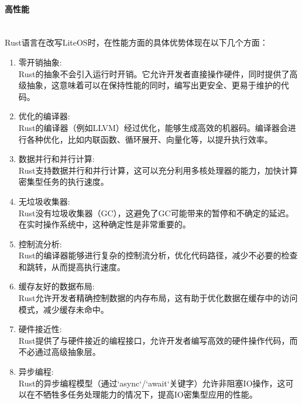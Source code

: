 \documentclass{ctexart}
\begin{document}
\paragraph{高性能}\ \\
\indent Rust语言在改写LiteOS时，在性能方面的具体优势体现在以下几个方面：
\begin{enumerate}
\item 零开销抽象:\\
Rust的抽象不会引入运行时开销。它允许开发者直接操作硬件，同时提供了高级抽象，这意味着可以在保持性能的同时，编写出更安全、更易于维护的代码。
\item 优化的编译器:\\
Rust的编译器（例如LLVM）经过优化，能够生成高效的机器码。编译器会进行各种优化，比如内联函数、循环展开、向量化等，以提升执行效率。
\item 数据并行和并行计算:\\
Rust支持数据并行和并行计算，这可以充分利用多核处理器的能力，加快计算密集型任务的执行速度。
\item 无垃圾收集器:\\
Rust没有垃圾收集器（GC），这避免了GC可能带来的暂停和不确定的延迟。在实时操作系统中，这种确定性是非常重要的。
\item 控制流分析:\\
Rust的编译器能够进行复杂的控制流分析，优化代码路径，减少不必要的检查和跳转，从而提高执行速度。
\item 缓存友好的数据布局:\\
Rust允许开发者精确控制数据的内存布局，这有助于优化数据在缓存中的访问模式，减少缓存未命中。
\item 硬件接近性:\\
Rust提供了与硬件接近的编程接口，允许开发者编写高效的硬件操作代码，而不必通过高级抽象层。
\item 异步编程:\\
Rust的异步编程模型（通过`async`/`await`关键字）允许非阻塞IO操作，这可以在不牺牲多任务处理能力的情况下，提高IO密集型应用的性能。
\end{enumerate}
\end{document}
